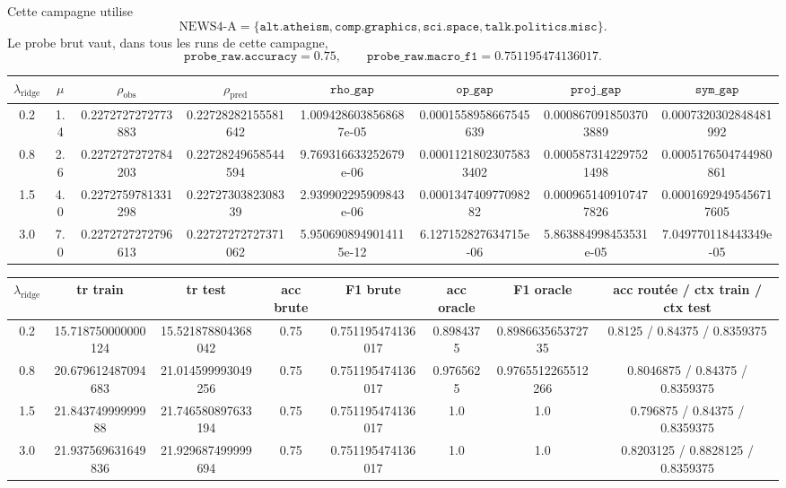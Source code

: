 Cette campagne utilise
\[
\text{NEWS4-A}=
\{\texttt{alt.atheism},\texttt{comp.graphics},\texttt{sci.space},\texttt{talk.politics.misc}\}.
\]
Le probe brut vaut, dans tous les runs de cette campagne,
\[
\texttt{probe\_raw.accuracy}=0.75,
\qquad
\texttt{probe\_raw.macro\_f1}=0.751195474136017.
\]

\begin{center}
\small
\begin{tabular}{c c c c c c c c}
\hline
\(\lambda_{\mathrm{ridge}}\) & \(\mu\) & \(\rho_{\mathrm{obs}}\) & \(\rho_{\mathrm{pred}}\) & \(\texttt{rho\_gap}\) & \(\texttt{op\_gap}\) & \(\texttt{proj\_gap}\) & \(\texttt{sym\_gap}\) \\
\hline
0.2 & 1.4 & 0.2272727272773883 & 0.22728282155581642 & 1.0094286038568687e-05 & 0.0001558958667545639 & 0.0008670918503703889 & 0.0007320302848481992 \\
0.8 & 2.6 & 0.2272727272784203 & 0.22728249658544594 & 9.769316633252679e-06 & 0.00011218023075833402 & 0.0005873142297521498 & 0.0005176504744980861 \\
1.5 & 4.0 & 0.2272759781331298 & 0.2272730382308339 & 2.939902295909843e-06 & 0.000134740977098282 & 0.0009651409107477826 & 0.00016929495456717605 \\
3.0 & 7.0 & 0.2272727272796613 & 0.22727272727371062 & 5.9506908949014115e-12 & 6.127152827634715e-06 & 5.863884998453531e-05 & 7.049770118443349e-05 \\
\hline
\end{tabular}
\end{center}

\begin{center}
\small
\begin{tabular}{c c c c c c c c}
\hline
\(\lambda_{\mathrm{ridge}}\) & tr train & tr test & acc brute & F1 brute & acc oracle & F1 oracle & acc routée / ctx train / ctx test \\
\hline
0.2 & 15.718750000000124 & 15.521878804368042 & 0.75 & 0.751195474136017 & 0.8984375 & 0.898663565372735 & 0.8125 / 0.84375 / 0.8359375 \\
0.8 & 20.679612487094683 & 21.014599993049256 & 0.75 & 0.751195474136017 & 0.9765625 & 0.9765512265512266 & 0.8046875 / 0.84375 / 0.8359375 \\
1.5 & 21.84374999999988 & 21.746580897633194 & 0.75 & 0.751195474136017 & 1.0 & 1.0 & 0.796875 / 0.84375 / 0.8359375 \\
3.0 & 21.937569631649836 & 21.929687499999694 & 0.75 & 0.751195474136017 & 1.0 & 1.0 & 0.8203125 / 0.8828125 / 0.8359375 \\
\hline
\end{tabular}
\end{center}

